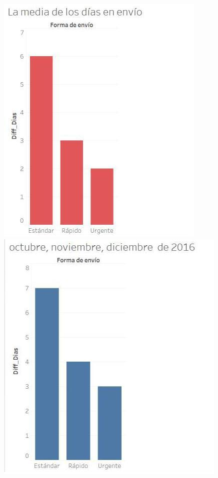 \documentclass{article}
\begin{document}
\includegraphics[scale=0.25]{imagenes/Media2016.jpg} 
\includegraphics[scale=0.25]{imagenes/TA2016.jpg} 
\end{document}
